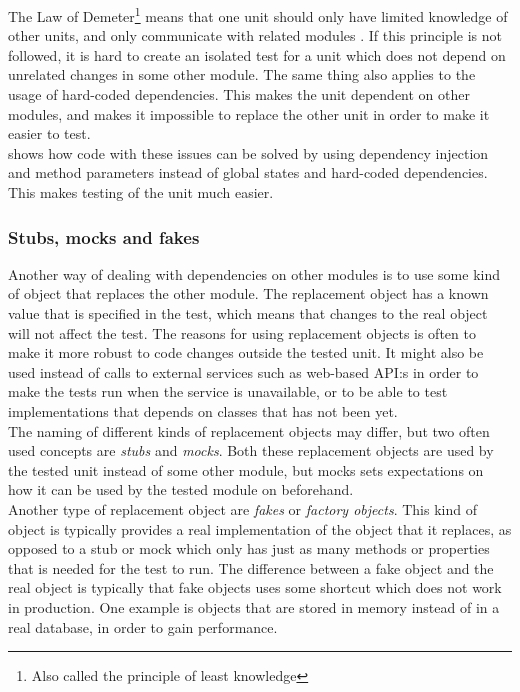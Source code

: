 The Law of Demeter\footnote{Also called the principle of least
knowledge} means that one unit should only have limited knowledge of
other units, and only communicate with related modules
\cite{wiki:demeter}. If this principle is not followed, it is hard to
create an isolated test for a unit which does not depend on unrelated
changes in some other module. The same thing also applies to the usage
of hard-coded dependencies. This makes the unit dependent on other
modules, and makes it impossible to replace the other unit in order to
make it easier to test.\\

\citeauthor{video:misko_psychology} shows how code with these issues can
be solved by using dependency injection and method parameters instead
of global states and hard-coded dependencies. This makes testing of the
unit much easier.\\


\subsubsection{Stubs, mocks and fakes}

Another way of dealing with dependencies on other modules is to use some
kind of object that replaces the other module. The replacement object
has a known value that is specified in the test, which means that
changes to the real object will not affect the test. The reasons for
using replacement objects is often to make it more robust to code
changes outside the tested unit. It might also be used instead of calls
to external services such as web-based API:s in order to make the tests
run when the service is unavailable, or to be able to test
implementations that depends on classes that has not been yet.\\

The naming of different kinds of replacement objects may differ, but two
often used concepts are \emph{stubs} and \emph{mocks}. Both these
replacement objects are used by the tested unit instead of some other
module, but mocks sets expectations on how it can be used by the tested
module on beforehand. \cite{web:mocks_arent_stubs}\\

Another type of replacement object are \emph{fakes} or \emph{factory
objects}. This kind of object is typically provides a real
implementation of the object that it replaces, as opposed to a stub or
mock which only has just as many methods or properties that is needed
for the test to run. The difference between a fake object and the real
object is typically that fake objects uses some shortcut which does not
work in production. One example is objects that are stored in memory
instead of in a real database, in order to gain performance.
\cite{web:mocks_arent_stubs}\\

